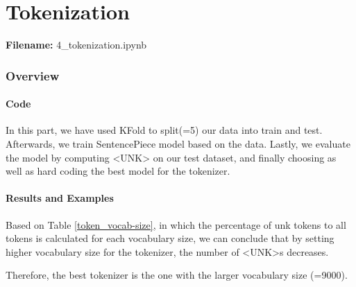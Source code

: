 \documentclass[12pt, a4paper]{article}
\begin{document}
\newpage
\part{Tokenization}
\large{\textbf{Filename:} 4\_tokenization.ipynb}
\section{Overview}

\subsection{Code}
In this part, we have used KFold to split(=5) our data into train and test. Afterwards, we train SentencePiece model based on the data. Lastly, we evaluate the model by computing <UNK> on our test dataset, and finally choosing as well as hard coding the best model for the tokenizer. 

\subsection{Results and Examples}
Based on Table \ref{token_vocab-size}, in which the percentage of unk tokens to all tokens is calculated for each vocabulary size, we can conclude that by setting higher vocabulary size for the tokenizer, the number of <UNK>s decreases.

Therefore, the best tokenizer is the one with the larger vocabulary size (=9000).
\end{document}
